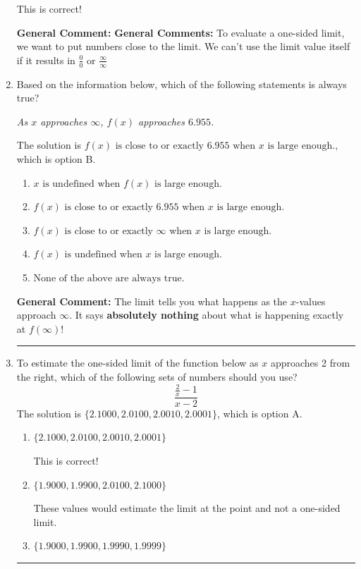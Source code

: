 \documentclass{extbook}[14pt]
\newcommand{\litem}[1]{\item #1

\rule{\textwidth}{0.4pt}}
\begin{document}
\begin{enumerate}
{\begin{enumerate}[label=\Alph*.]
This is correct!
\end{enumerate}

\textbf{General Comment:} \textbf{General Comments:} To evaluate a one-sided limit, we want to put numbers close to the limit. We can't use the limit value itself if it results in $\frac{0}{0}$ or $\frac{\infty}{\infty}$
}
\litem{
Based on the information below, which of the following statements is always true?

\begin{center}
    \textit{ As $x$ approaches $\infty$, $f(x)$ approaches $6.955$. }
\end{center}
The solution is \( f(x) \text{ is close to or exactly } 6.955 \text{ when } x \text{ is large enough}. \), which is option B.\begin{enumerate}[label=\Alph*.]
\item \( x \text{ is undefined when } f(x) \text{ is large enough}. \)


\item \( f(x) \text{ is close to or exactly } 6.955 \text{ when } x \text{ is large enough}. \)


\item \( f(x) \text{ is close to or exactly } \infty \text{ when } x \text{ is large enough}. \)


\item \( f(x) \text{ is undefined when } x \text{ is large enough}. \)


\item \( \text{None of the above are always true.} \)


\end{enumerate}

\textbf{General Comment:} The limit tells you what happens as the $x$-values approach $\infty$. It says \textbf{absolutely nothing} about what is happening exactly at $f(\infty)$!
}
\litem{
To estimate the one-sided limit of the function below as $x$ approaches 2 from the right, which of the following sets of numbers should you use?
\[ \frac{\frac{2}{x} - 1}{x - 2} \]The solution is \( \{ 2.1000, 2.0100, 2.0010, 2.0001 \} \), which is option A.\begin{enumerate}[label=\Alph*.]
\item \( \{ 2.1000, 2.0100, 2.0010, 2.0001 \} \)

This is correct!
\item \( \{ 1.9000, 1.9900, 2.0100, 2.1000 \} \)

These values would estimate the limit at the point and not a one-sided limit.
\item \( \{ 1.9000, 1.9900, 1.9990, 1.9999 \} \)


\end{enumerate}}
\end{enumerate}
\end{document}
